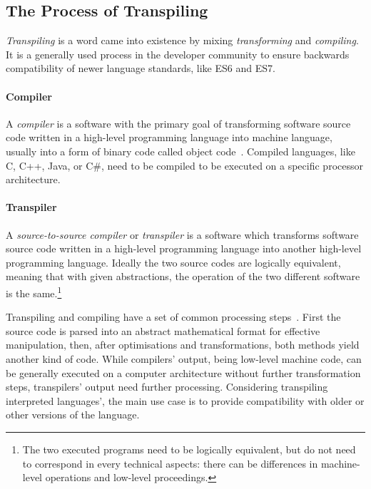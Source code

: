 \subsection{The Process of Transpiling}

\emph{Transpiling} is a word came into existence by mixing \emph{transforming} and \emph{compiling}. It is a generally used process in the \es developer community to ensure backwards compatibility of newer \es language standards, like ES6 and ES7.

\paragraph{Compiler}

A \emph{compiler} is a software with the primary goal of transforming software source code written in a high-level programming language into machine language, usually into a form of binary code called object code~\cite{pcmagcompilers}. Compiled languages, like C, C++, Java, or C\#, need to be compiled to be executed on a specific processor architecture.

\paragraph{Transpiler}

A \emph{source-to-source compiler} or \emph{transpiler} is a software which transforms software source code written in a high-level programming language into another high-level programming language. Ideally the two source codes are logically equivalent, meaning that with given abstractions, the operation of the two different software is the same.\footnote{The two executed programs need to be logically equivalent, but do not need to correspond in every technical aspects: there can be differences in machine-level operations and low-level proceedings.}

Transpiling and compiling have a set of common processing steps~\cite{kulkarnitranspiler}. First the source code is parsed into an abstract mathematical format for effective manipulation, then, after optimisations and transformations, both methods yield another kind of code. While compilers' output, being low-level machine code, can be generally executed on a computer architecture without further transformation steps, transpilers' output need further processing. Considering transpiling interpreted languages', the main use case is to provide compatibility with older or other versions of the language.

